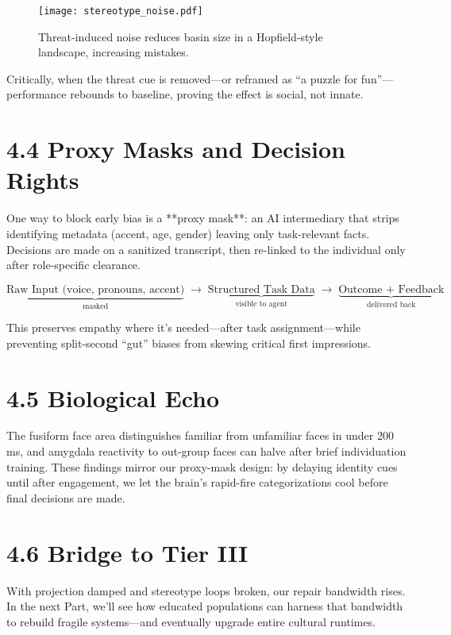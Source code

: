 \documentclass{book}       %
\begin{document}
\begin{figure}
  \texttt{[image: stereotype\_noise.pdf]}
  \caption{Threat-induced noise reduces basin size in a Hopfield-style landscape, increasing mistakes.}
\end{figure}

Critically, when the threat cue is removed—or reframed as “a puzzle for fun”—performance rebounds to baseline, proving the effect is social, not innate.

\section*{4.4  Proxy Masks and Decision Rights}

One way to block early bias is a **proxy mask**: an AI intermediary that strips identifying metadata (accent, age, gender) leaving only task-relevant facts.  Decisions are made on a sanitized transcript, then re-linked to the individual only after role-specific clearance.

\[
  \underbrace{\text{Raw Input (voice, pronouns, accent)}}_{\text{masked}}
  \;\longrightarrow\;
  \underbrace{\text{Structured Task Data}}_{\text{visible to agent}}
  \;\longrightarrow\;
  \underbrace{\text{Outcome + Feedback}}_{\text{delivered back}}
\]

This preserves empathy where it’s needed—after task assignment—while preventing split-second “gut” biases from skewing critical first impressions.

\section*{4.5  Biological Echo}

The fusiform face area distinguishes familiar from unfamiliar faces in under 200 ms\cite{Golby2001_Fusiform}, and amygdala reactivity to out-group faces can halve after brief individuation training\cite{Lebrecht2012_AmygdalaBias}.  These findings mirror our proxy-mask design: by delaying identity cues until after engagement, we let the brain’s rapid-fire categorizations cool before final decisions are made.

\section*{4.6  Bridge to Tier III}

With projection damped and stereotype loops broken, our repair bandwidth rises.  In the next Part, we’ll see how educated populations can harness that bandwidth to rebuild fragile systems—and eventually upgrade entire cultural runtimes.
\end{document}
